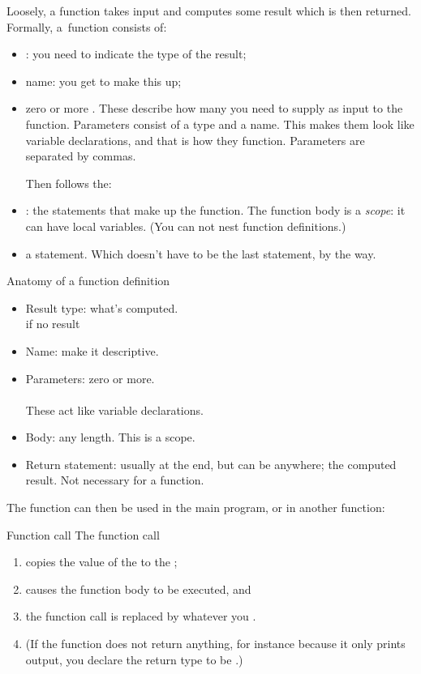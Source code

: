 Loosely, a function takes input and computes some result which is then returned.
Formally, a~function consists of:
\begin{itemize}
\item {}: you need to indicate
  the type of the result;
\item name: you get to make this up;
\item zero or more . These describe
  how many  you need to supply as
  input to the function. Parameters consist of a type and a name. This
  makes them look like variable declarations, and that is how they
  function. Parameters are separated by commas.

  Then follows the:
\item {}: the statements that make up
  the function. The function body is a \emph{scope}: it can have local
  variables. (You can not nest function definitions.)
\item a  statement. Which doesn't have to be
  the last statement, by the way.
\end{itemize}

\begin{slide}{Anatomy of a function definition}
  \label{sl:func-anatomy}
  \begin{itemize}
  \item Result type: what's computed.\\  if no result
  \item Name: make it descriptive.
  \item Parameters: zero or more.\\
    \\
    These act like variable declarations.
  \item Body: any length. This is a scope.
  \item Return statement: usually at the end, but can be anywhere; the
    computed result. Not necessary for a  function.
  \end{itemize}
\end{slide}

The function can then be used in the main program, or in another function:
\begin{block}{Function call}
  \label{sl:func-call}
  The function call
  \begin{enumerate}
  \item copies the value of the 
    to the ;
  \item causes the function body to be executed, and
  \item the function call is replaced by whatever you .
  \item (If the function does not return anything, for instance because
    it only prints output, you declare the return type to be .)
  \end{enumerate}
\end{block}

